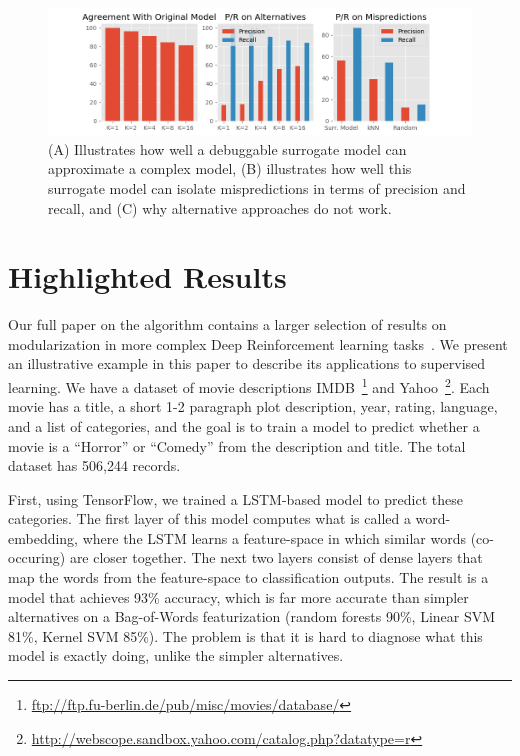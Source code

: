 
\begin{figure}
    \centering
    \includegraphics[width=\textwidth]{figures/result1.png}
    \caption{(A) Illustrates how well a debuggable surrogate model can approximate a complex model, (B) illustrates how well this surrogate model can isolate mispredictions in terms of precision and recall, and (C) why alternative approaches do not work.}
    \label{fig:teaser}
\end{figure}

\section{Highlighted Results}
Our full paper on the algorithm contains a larger selection of results on modularization in more complex Deep Reinforcement learning tasks~\cite{Krishnan17}.
We present an illustrative example in this paper to describe its applications to supervised learning.
We have a dataset of movie descriptions IMDB~\footnote{ \url{ftp://ftp.fu-berlin.de/pub/misc/movies/database/}} and Yahoo~\footnote{ \url{http://webscope.sandbox.yahoo.com/catalog.php?datatype=r}}.
Each movie has a title, a short 1-2 paragraph plot description, year, rating, language, and a list of categories, and the goal is to train a model to predict whether a movie is a ``Horror'' or ``Comedy'' from the description and title.  
The total dataset has 506,244 records.

First, using TensorFlow, we trained a LSTM-based model to predict these categories. The first layer of this model computes what is called a word-embedding, where the LSTM learns a feature-space in which similar words (co-occuring) are closer together. 
The next two layers consist of dense layers that map the words from the feature-space to classification outputs.
The result is a model that achieves 93\% accuracy, which is far more accurate than simpler alternatives on a Bag-of-Words featurization (random forests 90\%, Linear SVM 81\%, Kernel SVM 85\%).
The problem is that it is hard to diagnose what this model is exactly doing, unlike the simpler alternatives. 


